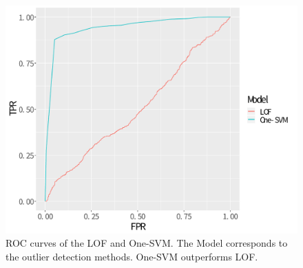 \documentclass[dvipdfmx, english]{ampmt}             %
\begin{document}
\begin{figure}[H]
\centerline{\includegraphics[scale=0.5]{../img/credit-roc.pdf}}
\caption{ROC curves of the LOF and One-SVM. The Model corresponds to the outlier detection methods. One-SVM outperforms LOF.}
\label{fig:credit-roc}
\end{figure}



\end{document}
